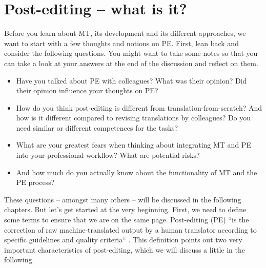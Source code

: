 \chapter{Post-editing -- what is it?}\label{sec:2}



\vspace{\baselineskip}

Before you learn about MT, its development and its different approaches, we want to start with a few thoughts and notions on PE. First, lean back and consider the following questions. You might want to take some notes so that you can take a look at your answers at the end of the discussion and reflect on them.
\begin{itemize}
            \item Have you talked about PE with colleagues? What was their opinion? Did their opinion influence your thoughts on PE?  
            \item How do you think post-editing is different from translation-from-scratch? And how is it different compared to revising translations by colleagues? Do you need similar or different competences for the tasks?
            \item What are your greatest fears when thinking about integrating MT and PE into your professional workflow? What are potential risks?
            \item And how much do you actually know about the functionality of MT and the PE process?
        \end{itemize}

These questions -- amongst many others -- will be discussed in the following chapters. But let's get started at the very beginning. First, we need to define some terms to ensure that we are on the same page. Post-editing (PE) “is the correction of raw machine-translated output by a human translator according to specific guidelines and quality criteria“ \citep[197-198]{obrien_towards_2011}. This definition points out two very important characteristics of post-editing, which we will discuss a little in the following.

